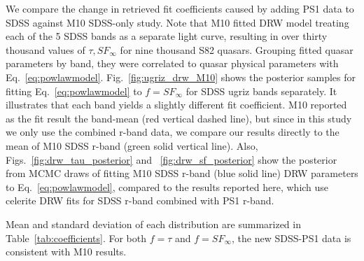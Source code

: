 \documentclass[twocolumn]{aastex62}
\newcommand{\project}[1]{\textsf{#1}}
\begin{document}
We compare the change in retrieved fit coefficients caused by adding PS1 data to SDSS against M10 SDSS-only study. Note that M10 fitted  DRW model treating each of the 5 SDSS bands as a separate light curve, resulting in over thirty thousand values of $\tau, SF_{\infty}$ for nine thousand S82 quasars. Grouping fitted quasar parameters by band, they were correlated to quasar physical parameters with Eq.~\ref{eq:powlawmodel}. Fig.~\ref{fig:ugriz_drw_M10} shows the posterior samples for fitting  Eq.~\ref{eq:powlawmodel} to $f=SF_{\infty}$ for SDSS ugriz bands separately. It illustrates that each band yields a slightly different fit coefficient. M10 reported as the fit result the band-mean (red vertical dashed line), but since in this study we only use the combined r-band data, we compare our results directly to the mean of  M10 SDSS r-band (green solid vertical line). Also, Figs.~\ref{fig:drw_tau_posterior} and ~\ref{fig:drw_sf_posterior} show the posterior from MCMC draws of fitting M10 SDSS r-band (blue solid line) DRW parameters to Eq.~\ref{eq:powlawmodel}, compared to the results reported here, which use \project{celerite} DRW fits for SDSS r-band combined with PS1 r-band.  






\begin{figure*}  %
\caption{Wavelength dependence of  DRW parameters (as fitted  by M10),  corrected for wavelength dependence, are correlated against $M_{i}$ and $M_{BH}$ \citep{shen2011}. Results for each SDSS band are fitted separately for A, C, D coefficients  in Eq.~\ref{eq:powlawmodel}. The red dashed vertical line marks the mean of all band-averaged values, reported by M10 in Table 1. However, since we are fitting with r-band data only,  we compare our results to the mean of M10 r-band results, marked with green solid vertical line.}
\label{fig:ugriz_drw_M10}
\end{figure*} 

 Mean and standard deviation of each distribution are summarized in Table~\ref{tab:coefficients}.  For both $f{=}\tau$  and $f{=}SF_{\infty}$, the new SDSS-PS1 data is consistent with M10 results.
\end{document}
